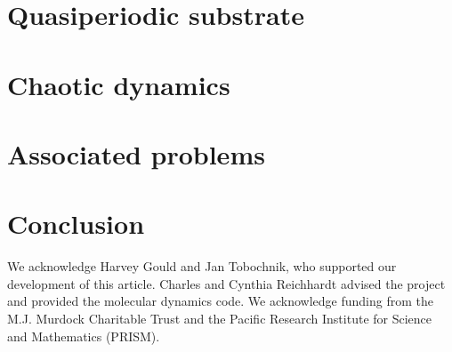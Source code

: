 \documentclass[prb,preprint]{revtex4}
\begin{document}
\section{Quasiperiodic substrate}
\label{sec:quasiperiod}	%

\section{Chaotic dynamics}
\label{sec:chaos}	%

\section{Associated problems}
\label{sec:problems}	%


\section{Conclusion}
\label{sec:conclusion}	%


\begin{acknowledgments}

  We acknowledge Harvey Gould and Jan Tobochnik, who supported our development of this article.
  Charles and Cynthia Reichhardt advised 
  the project and provided the molecular dynamics code.
  We acknowledge funding from the M.J. Murdock Charitable Trust
  and the Pacific Research Institute for Science and Mathematics (PRISM).

\end{acknowledgments}
\end{document}
